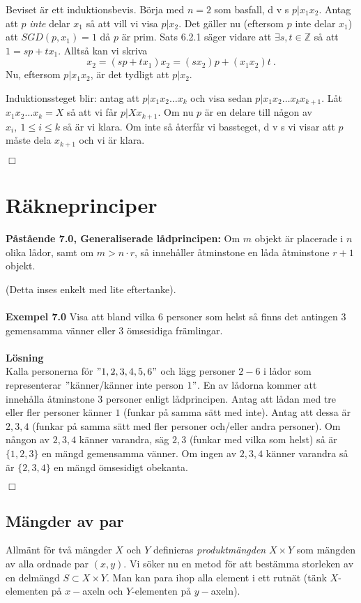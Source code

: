 \documentclass{article}
\begin{document}
Beviset är ett induktionsbevis. Börja med $n=2$ som basfall, d v s $p|x_1x_2$. Antag att $p$ \textit{inte} delar $x_1$ så att vill vi visa $p|x_2$. Det gäller nu (eftersom $p$ inte delar $x_1$) att $SGD(p,x_1)=1$ då $p$ är prim. Sats 6.2.1 säger vidare att $\exists s,t\in\mathbb{Z}$ så att $1=sp+tx_1$. Alltså kan vi skriva
$$
x_2=(sp+tx_1)x_2=(sx_2)p+(x_1x_2)t \ .
$$
Nu, eftersom $p|x_1x_2$, är det tydligt att $p|x_2$.

Induktionssteget blir: antag att $p|x_1x_2\hdots x_k$ och visa sedan $p|x_1x_2\hdots x_kx_{k+1}$. Låt $x_1x_2\hdots x_k=X$ så att vi får $p|Xx_{k+1}$. Om nu $p$ är en delare till någon av $x_i, \ 1\leq i\leq k$ så är vi klara. Om inte så återfår vi bassteget, d v s vi visar att $p$ måste dela $x_{k+1}$ och vi är klara.
\begin{flushright}
$\Box$
\end{flushright}

\section{Räkneprinciper}
\textbf{Påstående 7.0, Generaliserade lådprincipen:} Om $m$ objekt är placerade i $n$ olika lådor, samt om $m>n\cdot r$, så innehåller åtminstone en låda åtminstone $r+1$ objekt. 

(Detta inses enkelt med lite eftertanke).\\ \\
\textbf{Exempel 7.0} Visa att bland vilka $6$ personer som helst så finns det antingen $3$ gemensamma vänner eller $3$ ömsesidiga främlingar. \\ \\
\textbf{Lösning}\\
Kalla personerna för $"1,2,3,4,5,6"$ och lägg personer $2-6$ i lådor som representerar $"$känner/känner inte person $1"$. En av lådorna kommer att innehålla åtminstone $3$ personer enligt lådprincipen. Antag att lådan med tre eller fler personer känner $1$ (funkar på samma sätt med inte). Antag att dessa är $2,3,4$ (funkar på samma sätt med fler personer och/eller andra personer). Om nångon av $2,3,4$ känner varandra, säg $2,3$ (funkar med vilka som helst) så är $\{1,2,3\}$ en mängd gemensamma vänner. Om ingen av $2,3,4$ känner varandra så är $\{2,3,4\}$ en mängd ömsesidigt obekanta.
\begin{flushright}
$\Box$
\end{flushright}
\subsection{Mängder av par}
Allmänt för två mängder $X$ och $Y$ definieras \textit{produktmängden} $X\times Y$ som mängden av alla ordnade par $(x,y)$. Vi söker nu en metod för att bestämma storleken av en delmängd $S\subset X\times Y$. Man kan para ihop alla element i ett rutnät (tänk $X$-elementen på $x-$axeln och $Y$-elementen på $y-$axeln).
\end{document}
